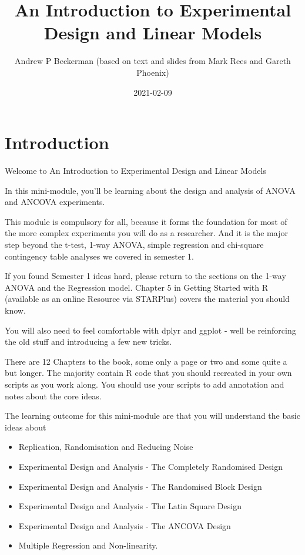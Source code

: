 \documentclass[
]{book}
\title{An Introduction to Experimental Design and Linear Models}
\author{Andrew P Beckerman (based on text and slides from Mark Rees and Gareth Phoenix)}
\date{2021-02-09}
\providecommand{\tightlist}{%
  \setlength{\itemsep}{0pt}\setlength{\parskip}{0pt}}
\begin{document}
\maketitle

{
\setcounter{tocdepth}{1}
\tableofcontents
}
\hypertarget{introduction}{%
\chapter{Introduction}\label{introduction}}

Welcome to An Introduction to Experimental Design and Linear Models

In this mini-module, you'll be learning about the design and analysis of ANOVA and ANCOVA experiments.

This module is compulsory for all, because it forms the foundation for most of the more complex experiments you will do as a researcher. And it is the major step beyond the t-test, 1-way ANOVA, simple regression and chi-square contingency table analyses we covered in semester 1.

If you found Semester 1 ideas hard, please return to the sections on the 1-way ANOVA and the Regression model. Chapter 5 in Getting Started with R (available as an online Resource via STARPlus) covers the material you should know.

You will also need to feel comfortable with dplyr and ggplot - well be reinforcing the old stuff and introducing a few new tricks.

There are 12 Chapters to the book, some only a page or two and some quite a but longer. The majority contain R code that you should recreated in your own scripts as you work along. You should use your scripts to add annotation and notes about the core ideas.

The learning outcome for this mini-module are that you will understand the basic ideas about

\begin{itemize}
\tightlist
\item
  Replication, Randomisation and Reducing Noise
\item
  Experimental Design and Analysis - The Completely Randomised Design
\item
  Experimental Design and Analysis - The Randomised Block Design
\item
  Experimental Design and Analysis - The Latin Square Design
\item
  Experimental Design and Analysis - The ANCOVA Design
\item
  Multiple Regression and Non-linearity.
\end{itemize}
\end{document}
